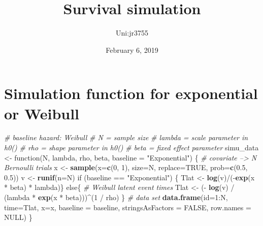 \documentclass[]{article}
\title{Survival simulation}
\author{Uni:jr3755}
\date{February 6, 2019}
\newenvironment{Shaded}{\begin{snugshade}}{\end{snugshade}}
\newcommand{\KeywordTok}[1]{\textcolor[rgb]{0.13,0.29,0.53}{\textbf{{#1}}}}
\newcommand{\DataTypeTok}[1]{\textcolor[rgb]{0.13,0.29,0.53}{{#1}}}
\newcommand{\DecValTok}[1]{\textcolor[rgb]{0.00,0.00,0.81}{{#1}}}
\newcommand{\FloatTok}[1]{\textcolor[rgb]{0.00,0.00,0.81}{{#1}}}
\newcommand{\StringTok}[1]{\textcolor[rgb]{0.31,0.60,0.02}{{#1}}}
\newcommand{\CommentTok}[1]{\textcolor[rgb]{0.56,0.35,0.01}{\textit{{#1}}}}
\newcommand{\OtherTok}[1]{\textcolor[rgb]{0.56,0.35,0.01}{{#1}}}
\newcommand{\NormalTok}[1]{{#1}}
\begin{document}
\maketitle

\section{Simulation function for exponential or
Weibull}\label{simulation-function-for-exponential-or-weibull}

\begin{Shaded}
\begin{Highlighting}[]
\CommentTok{# baseline hazard: Weibull}
\CommentTok{# N = sample size    }
\CommentTok{# lambda = scale parameter in h0()}
\CommentTok{# rho = shape parameter in h0()}
\CommentTok{# beta = fixed effect parameter}
\NormalTok{simu_data <-}\StringTok{ }\NormalTok{function(N, lambda, rho, beta, }\DataTypeTok{baseline =} \StringTok{"Exponential"}\NormalTok{)}
\NormalTok{\{}
  \CommentTok{# covariate --> N Bernoulli trials}
  \NormalTok{x <-}\StringTok{ }\KeywordTok{sample}\NormalTok{(}\DataTypeTok{x=}\KeywordTok{c}\NormalTok{(}\DecValTok{0}\NormalTok{, }\DecValTok{1}\NormalTok{), }\DataTypeTok{size=}\NormalTok{N, }\DataTypeTok{replace=}\OtherTok{TRUE}\NormalTok{, }\DataTypeTok{prob=}\KeywordTok{c}\NormalTok{(}\FloatTok{0.5}\NormalTok{, }\FloatTok{0.5}\NormalTok{))}
  \NormalTok{v <-}\StringTok{ }\KeywordTok{runif}\NormalTok{(}\DataTypeTok{n=}\NormalTok{N)}
  \NormalTok{if (baseline ==}\StringTok{ "Exponential"}\NormalTok{) \{}
    \NormalTok{Tlat <-}\StringTok{ }\KeywordTok{log}\NormalTok{(v)/(-}\KeywordTok{exp}\NormalTok{(x *}\StringTok{ }\NormalTok{beta) *}\StringTok{ }\NormalTok{lambda)\}}
  \NormalTok{else\{}
    \CommentTok{# Weibull latent event times}
    \NormalTok{Tlat <-}\StringTok{ }\NormalTok{(-}\StringTok{ }\KeywordTok{log}\NormalTok{(v) /}\StringTok{ }\NormalTok{(lambda *}\StringTok{ }\KeywordTok{exp}\NormalTok{(x *}\StringTok{ }\NormalTok{beta)))^(}\DecValTok{1} \NormalTok{/}\StringTok{ }\NormalTok{rho)}
  \NormalTok{\}}
  \CommentTok{# data set}
  \KeywordTok{data.frame}\NormalTok{(}\DataTypeTok{id=}\DecValTok{1}\NormalTok{:N,}
             \DataTypeTok{time=}\NormalTok{Tlat,}
             \DataTypeTok{x=}\NormalTok{x,}
             \DataTypeTok{baseline =} \NormalTok{baseline, }\DataTypeTok{stringsAsFactors =} \OtherTok{FALSE}\NormalTok{, }\DataTypeTok{row.names =} \OtherTok{NULL}\NormalTok{)}
\NormalTok{\}}
\end{Highlighting}
\end{Shaded}
\end{document}
